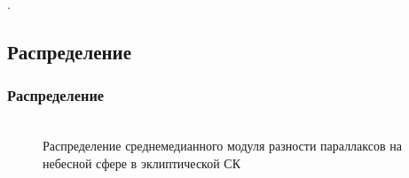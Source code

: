 \documentclass[12pt,aspectratio=43]{beamer}
\begin{document}
\begin{frame}[<alignment>]
\begin{figure}[h!]
\label{img:healpix}
\end{figure}
.\end{frame}	

\subsection{Распределение}\label{sub:smthhealpix}

\begin{frame}[<alignment>]
\frametitle{Распределение}
\begin{figure}[h!]
\\{Распределение среднемедианного модуля разности параллаксов на небесной сфере в эклиптической СК}
\label{img:sf_lo}
\end{figure}

\end{frame}	
\end{document}
